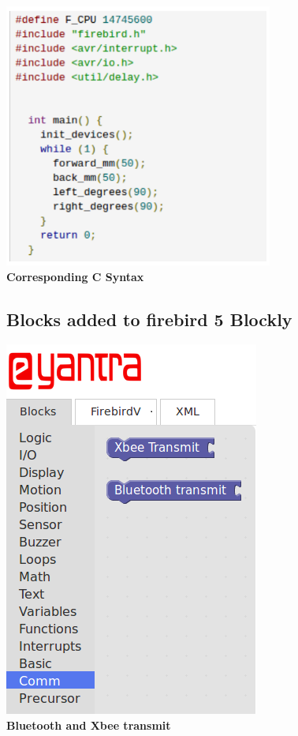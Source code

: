 \documentclass[a4paper,12pt,oneside]{book}
\begin{document}
    \begin{center}
    \includegraphics[scale =0.5]{imag8}\\[.1in]
    \textbf{Corresponding C Syntax}
    \end{center}
    
    \newpage\begin{center}
    \section{Blocks added to firebird 5 Blockly}
    \end{center}
    
    \begin{center}
    \includegraphics[scale =0.6]{xbtransm}\\[.3in]
    \textbf{Bluetooth and Xbee transmit}\\[1.3in]
    \end{center}
    
\end{document}
